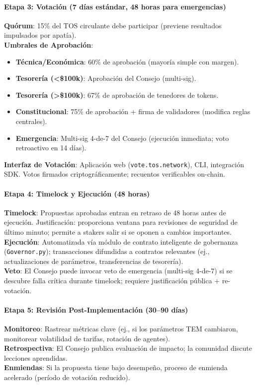 \documentclass[11pt]{article}
\begin{document}
\paragraph{Etapa 3: Votación (7 días estándar, 48 horas para emergencias)}
\textbf{Quórum}: 15\% del TOS circulante debe participar (previene resultados impulsados por apatía).\\
\textbf{Umbrales de Aprobación}:
\begin{itemize}[noitemsep]
  \item \textbf{Técnica/Económica}: 60\% de aprobación (mayoría simple con margen).
  \item \textbf{Tesorería (<\$100k)}: Aprobación del Consejo (multi-sig).
  \item \textbf{Tesorería (>\$100k)}: 67\% de aprobación de tenedores de tokens.
  \item \textbf{Constitucional}: 75\% de aprobación + firma de validadores (modifica reglas centrales).
  \item \textbf{Emergencia}: Multi-sig 4-de-7 del Consejo (ejecución inmediata; voto retroactivo en 14 días).
\end{itemize}
\textbf{Interfaz de Votación}: Aplicación web (\texttt{vote.tos.network}), CLI, integración SDK. Votos firmados criptográficamente; recuentos verificables on-chain.

\paragraph{Etapa 4: Timelock y Ejecución (48 horas)}
\textbf{Timelock}: Propuestas aprobadas entran en retraso de 48 horas antes de ejecución. Justificación: proporciona ventana para revisiones de seguridad de último minuto; permite a stakers salir si se oponen a cambios importantes.\\
\textbf{Ejecución}: Automatizada vía módulo de contrato inteligente de gobernanza (\texttt{Governor.py}); transacciones difundidas a contratos relevantes (ej., actualizaciones de parámetros, transferencias de tesorería).\\
\textbf{Veto}: El Consejo puede invocar veto de emergencia (multi-sig 4-de-7) si se descubre falla crítica durante timelock; requiere justificación pública + re-votación.

\paragraph{Etapa 5: Revisión Post-Implementación (30--90 días)}
\textbf{Monitoreo}: Rastrear métricas clave (ej., si los parámetros TEM cambiaron, monitorear volatilidad de tarifas, rotación de agentes).\\
\textbf{Retrospectiva}: El Consejo publica evaluación de impacto; la comunidad discute lecciones aprendidas.\\
\textbf{Enmiendas}: Si la propuesta tiene bajo desempeño, proceso de enmienda acelerado (período de votación reducido).
\end{document}
